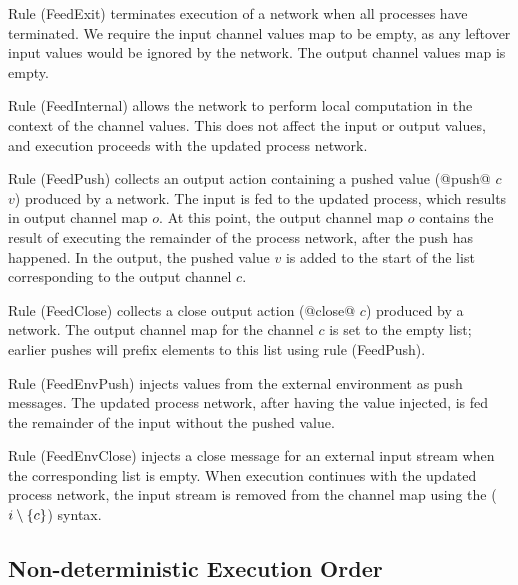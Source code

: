 Rule (FeedExit) terminates execution of a network when all processes have terminated.
We require the input channel values map to be empty, as any leftover input values would be ignored by the network.
The output channel values map is empty.

Rule (FeedInternal) allows the network to perform local computation in the context of the channel values.
This does not affect the input or output values, and execution proceeds with the updated process network.

Rule (FeedPush) collects an output action containing a pushed value (@push@ $c$ $v$) produced by a network.
The input is fed to the updated process, which results in output channel map $o$.
At this point, the output channel map $o$ contains the result of executing the remainder of the process network, after the push has happened.
In the output, the pushed value $v$ is added to the start of the list corresponding to the output channel $c$.

Rule (FeedClose) collects a close output action (@close@ $c$) produced by a network.
The output channel map for the channel $c$ is set to the empty list; earlier pushes will prefix elements to this list using rule (FeedPush).

Rule (FeedEnvPush) injects values from the external environment as push messages.
The updated process network, after having the value injected, is fed the remainder of the input without the pushed value.

Rule (FeedEnvClose) injects a close message for an external input stream when the corresponding list is empty.
When execution continues with the updated process network, the input stream is removed from the channel map using the ($i \setminus \{ c \}$) syntax.



\subsection{Non-deterministic Execution Order}
\label{s:EvaluationOrder}

